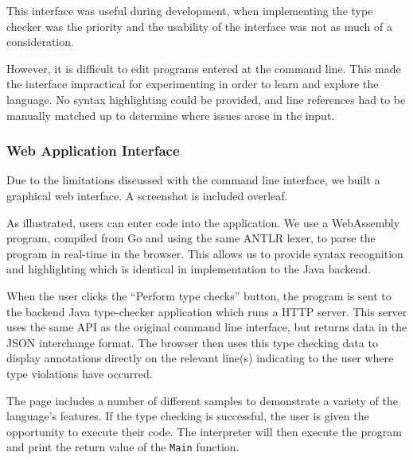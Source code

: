 \documentclass[a4paper,openany,12pt]{book}
\begin{document}
This interface was useful during development, when implementing the type checker was the priority and the usability
of the interface was not as much of a consideration.

However, it is difficult to edit programs entered at the command line.
This made the interface impractical for experimenting in order to learn and explore the language.
No syntax highlighting could be provided, and line references had to be manually matched up to determine where
issues arose in the input.

\subsubsection{Web Application Interface}

Due to the limitations discussed with the command line interface, we built a graphical web interface.
A screenshot is included overleaf.

As illustrated, users can enter code into the application.
We use a WebAssembly program, compiled from Go and using the same ANTLR lexer, to parse the program in real-time in
the browser.
This allows us to provide syntax recognition and highlighting which is identical in implementation to the Java backend.

When the user clicks the ``Perform type checks'' button, the program is sent to the backend Java type-checker application
which runs a HTTP server.
This server uses the same API as the original command line interface, but returns data in the JSON interchange format.
The browser then uses this type checking data to display annotations directly on the relevant line(s) indicating to the
user where type violations have occurred.

The page includes a number of different samples to demonstrate a variety of the language's features.
If the type checking is successful, the user is given the opportunity to execute their code.
The interpreter will then execute the program and print the return value of the \texttt{Main} function.
\end{document}
